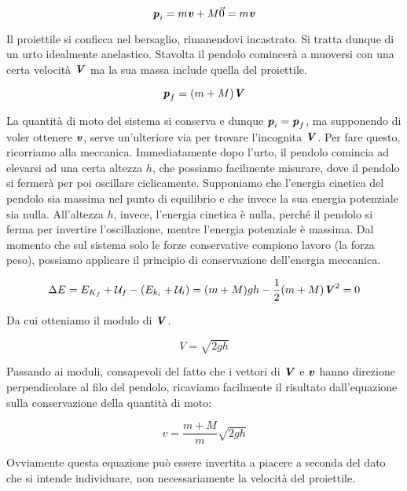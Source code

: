 \[ \textbf{\textit{p}}_i = m\textbf{\textit{v}} + M\vec{0} = m\textbf{\textit{v}} \]

\noindent Il proiettile si conficca nel bersaglio, rimanendovi incastrato.
Si tratta dunque di un urto idealmente anelastico. Stavolta il
pendolo comincerà a muoversi con una certa velocità $\textbf{\textit{V}}$
ma la sua massa include quella del proiettile.

\[ \textbf{\textit{p}}_f = (m + M)\textbf{\textit{V}} \]

\noindent La quantità di moto del sistema si conserva e dunque
$\textbf{\textit{p}}_i = \textbf{\textit{p}}_f$, ma supponendo di voler ottenere $\textbf{\textit{v}}$,
serve un'ulteriore
via per trovare l'incognita $\textbf{\textit{V}}$. Per fare questo, ricorriamo alla
meccanica. Immediatamente dopo l'urto, il pendolo comincia
ad elevarsi ad una certa altezza $h$, che possiamo
facilmente misurare, dove il pendolo si fermerà per poi oscillare
ciclicamente. Supponiamo che l'energia cinetica del pendolo sia
massima nel punto di equilibrio e che invece la sua energia potenziale
sia nulla. All'altezza $h$, invece, l'energia cinetica è nulla, perché
il pendolo si ferma per invertire l'oscillazione, mentre l'energia
potenziale è massima. Dal momento che sul sistema solo le forze
conservative compiono lavoro (la forza peso), possiamo applicare il
principio di conservazione dell'energia meccanica.

\[ \Delta E = E_{K_f} + \mathcal{U}_f - (E_{k_i} + \mathcal{U}_i) = (m + M)gh - \frac12(m + M)\textbf{\textit{V}}^2 = 0 \]

\noindent Da cui otteniamo il modulo di $\textbf{\textit{V}}$.

\[ V = \sqrt{2gh} \]

\noindent Passando ai moduli, consapevoli del fatto che i vettori
di $\textbf{\textit{V}}$ e $\textbf{\textit{v}}$ hanno direzione perpendicolare al
filo del pendolo, ricaviamo facilmente il risultato
dall'equazione sulla conservazione della quantità di moto:

\[ v = \frac{m + M}{m}\sqrt{2gh} \]

\noindent Ovviamente questa equazione può essere invertita a piacere
a seconda del dato che si intende individuare, non necessariamente
la velocità del proiettile.




